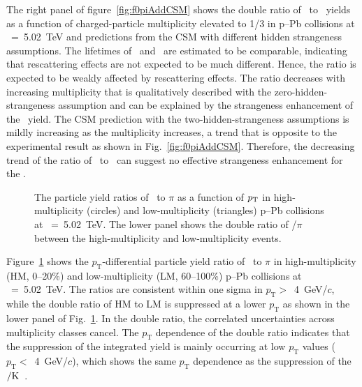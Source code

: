 The right panel of figure~\ref{fig:f0piAddCSM} shows the double ratio of \fzero~to \kstar~yields as a function of charged-particle multiplicity elevated to 1/3 in p--Pb collisions at \snn~=~5.02~TeV and predictions from the CSM with different hidden strangeness assumptions. The lifetimes of \fzero~and \kstar~are estimated to be comparable, indicating that rescattering effects are not expected to be much different. Hence, the ratio is expected to be weakly affected by rescattering effects. The ratio decreases with increasing multiplicity that is qualitatively described with the zero-hidden-strangeness assumption and can be explained by the strangeness enhancement of the \kstar~yield. The CSM prediction with the two-hidden-strangeness assumptions is mildly increasing as the multiplicity increases, a trend that is opposite to the experimental result as shown in Fig.~\ref{fig:f0piAddCSM}. Therefore, the decreasing trend of the ratio of \fzero~to \kstar~can suggest no effective strangeness enhancement for the \fzero.

\begin{figure}[!hbt]
	\centering
	\caption{ The particle yield ratios of \fzero~to $\pi$ as a function of $p_{\rm{T}}$ in high-multiplicity (circles) and low-multiplicity (triangles) p--Pb collisions at \snn~=~5.02~TeV. The lower panel shows the double ratio of \fzero/$\pi$ between the high-multiplicity and low-multiplicity events. }
	\label{fig:f0piPt}
\end{figure}

Figure~\ref{fig:f0piPt} shows the $p_{\mathrm{T}}$-differential particle yield ratio of \fzero~to $\pi$ in high-multiplicity (HM, 0--20\%) and low-multiplicity (LM, 60--100\%) p--Pb collisions at \snn~=~5.02~TeV. The ratios are consistent within one sigma in $p_{\mathrm{T}}>$~4~GeV/$c$, while the double ratio of HM to LM is suppressed at a lower $p_{\mathrm{T}}$ as shown in the lower panel of Fig.~\ref{fig:f0piPt}. In the double ratio, the correlated uncertainties across multiplicity classes cancel. The $p_{\mathrm{T}}$ dependence of the double ratio indicates that the suppression of the integrated yield is mainly occurring at low $p_{\mathrm{T}}$ values ($p_{\mathrm{T}}<$~4~GeV/$c$), which shows the same $p_{\mathrm{T}}$ dependence as the suppression of the \kstar$\rm{}/K$~\cite{ALICE:2019etb}.

